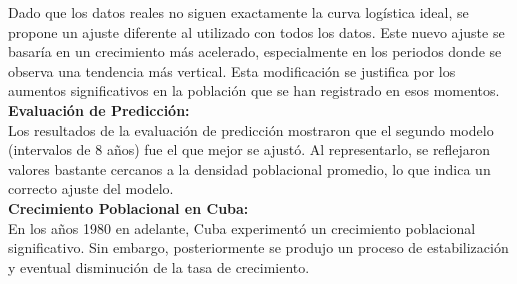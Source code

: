 \documentclass[a4paper,10pt,twocolumn]{article}
\begin{document}
Dado que los datos reales no siguen exactamente la curva logística ideal, se propone un ajuste diferente al utilizado con todos los datos. Este nuevo ajuste se basaría en un crecimiento más acelerado, especialmente en los periodos donde se observa una tendencia más vertical. Esta modificación se justifica por los aumentos significativos en la población que se han registrado en esos momentos.\\
\textbf{Evaluación de Predicción:}\\
Los resultados de la evaluación de predicción mostraron que el segundo modelo (intervalos de 8 años) fue el que mejor se ajustó. Al representarlo, se reflejaron valores bastante cercanos a la densidad poblacional promedio, lo que indica un correcto ajuste del modelo.\\
\textbf{Crecimiento Poblacional en Cuba:}\\
En los años 1980 en adelante, Cuba experimentó un crecimiento poblacional significativo. Sin embargo, posteriormente se produjo un proceso de estabilización y eventual disminución de la tasa de crecimiento.


\end{document}
